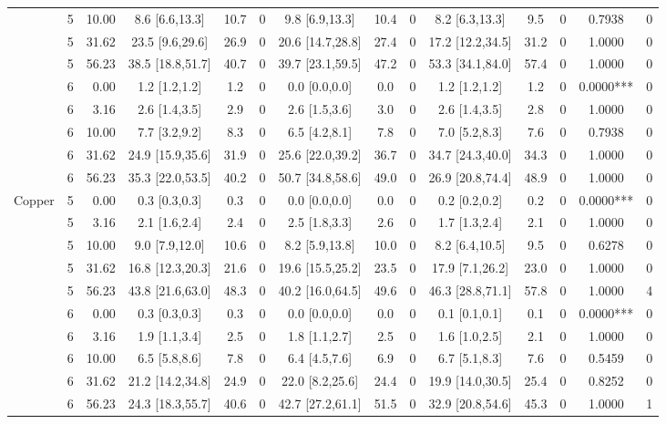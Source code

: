 \begin{table}[htbp]
\begin{tabular}{llr|ccc|ccc|ccc|cr}
 & 5 & 10.00 & 8.6 [6.6,13.3] & 10.7 & 0 & 9.8 [6.9,13.3] & 10.4 & 0 & 8.2 [6.3,13.3] & 9.5 & 0 & 0.7938 & 0\\
 & 5 & 31.62 & 23.5 [9.6,29.6] & 26.9 & 0 & 20.6 [14.7,28.8] & 27.4 & 0 & 17.2 [12.2,34.5] & 31.2 & 0 & 1.0000 & 0\\
 & 5 & 56.23 & 38.5 [18.8,51.7] & 40.7 & 0 & 39.7 [23.1,59.5] & 47.2 & 0 & 53.3 [34.1,84.0] & 57.4 & 0 & 1.0000 & 0\\
 & 6 & 0.00 & 1.2 [1.2,1.2] & 1.2 & 0 & 0.0 [0.0,0.0] & 0.0 & 0 & 1.2 [1.2,1.2] & 1.2 & 0 & 0.0000*** & 0\\
 & 6 & 3.16 & 2.6 [1.4,3.5] & 2.9 & 0 & 2.6 [1.5,3.6] & 3.0 & 0 & 2.6 [1.4,3.5] & 2.8 & 0 & 1.0000 & 0\\
 & 6 & 10.00 & 7.7 [3.2,9.2] & 8.3 & 0 & 6.5 [4.2,8.1] & 7.8 & 0 & 7.0 [5.2,8.3] & 7.6 & 0 & 0.7938 & 0\\
 & 6 & 31.62 & 24.9 [15.9,35.6] & 31.9 & 0 & 25.6 [22.0,39.2] & 36.7 & 0 & 34.7 [24.3,40.0] & 34.3 & 0 & 1.0000 & 0\\
 & 6 & 56.23 & 35.3 [22.0,53.5] & 40.2 & 0 & 50.7 [34.8,58.6] & 49.0 & 0 & 26.9 [20.8,74.4] & 48.9 & 0 & 1.0000 & 0\\
\midrule Copper & 5 & 0.00 & 0.3 [0.3,0.3] & 0.3 & 0 & 0.0 [0.0,0.0] & 0.0 & 0 & 0.2 [0.2,0.2] & 0.2 & 0 & 0.0000*** & 0\\
 & 5 & 3.16 & 2.1 [1.6,2.4] & 2.4 & 0 & 2.5 [1.8,3.3] & 2.6 & 0 & 1.7 [1.3,2.4] & 2.1 & 0 & 1.0000 & 0\\
 & 5 & 10.00 & 9.0 [7.9,12.0] & 10.6 & 0 & 8.2 [5.9,13.8] & 10.0 & 0 & 8.2 [6.4,10.5] & 9.5 & 0 & 0.6278 & 0\\
 & 5 & 31.62 & 16.8 [12.3,20.3] & 21.6 & 0 & 19.6 [15.5,25.2] & 23.5 & 0 & 17.9 [7.1,26.2] & 23.0 & 0 & 1.0000 & 0\\
 & 5 & 56.23 & 43.8 [21.6,63.0] & 48.3 & 0 & 40.2 [16.0,64.5] & 49.6 & 0 & 46.3 [28.8,71.1] & 57.8 & 0 & 1.0000 & 4\\
 & 6 & 0.00 & 0.3 [0.3,0.3] & 0.3 & 0 & 0.0 [0.0,0.0] & 0.0 & 0 & 0.1 [0.1,0.1] & 0.1 & 0 & 0.0000*** & 0\\
 & 6 & 3.16 & 1.9 [1.1,3.4] & 2.5 & 0 & 1.8 [1.1,2.7] & 2.5 & 0 & 1.6 [1.0,2.5] & 2.1 & 0 & 1.0000 & 0\\
 & 6 & 10.00 & 6.5 [5.8,8.6] & 7.8 & 0 & 6.4 [4.5,7.6] & 6.9 & 0 & 6.7 [5.1,8.3] & 7.6 & 0 & 0.5459 & 0\\
 & 6 & 31.62 & 21.2 [14.2,34.8] & 24.9 & 0 & 22.0 [8.2,25.6] & 24.4 & 0 & 19.9 [14.0,30.5] & 25.4 & 0 & 0.8252 & 0\\
 & 6 & 56.23 & 24.3 [18.3,55.7] & 40.6 & 0 & 42.7 [27.2,61.1] & 51.5 & 0 & 32.9 [20.8,54.6] & 45.3 & 0 & 1.0000 & 1\\

\end{tabular}
\end{table}
